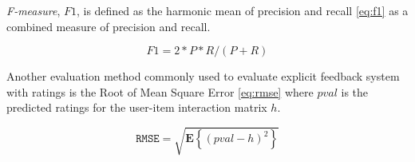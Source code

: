 \textit{F-measure}, $\mathit{F1}$, is defined as the harmonic mean of precision and recall \eqref{eq:f1} as a combined measure of precision and recall.

\begin{equation} \label{eq:f1}
    \mathit{F1} = 2 * P * R / (P + R)
\end{equation}


Another evaluation method commonly used to evaluate explicit feedback system with ratings is the Root of Mean Square Error \rmse \hspace{0.2ex} \eqref{eq:rmse} where $\mathit{pval}$ is the predicted ratings for the user-item interaction matrix $h$.
\citep{bobadilla2013recommender}

\begin{equation} \label{eq:rmse}
    \mathtt{RMSE} = \sqrt{\mathbf{E}\left\{ (\mathit{pval} - h)^2 \right\}}
\end{equation}

